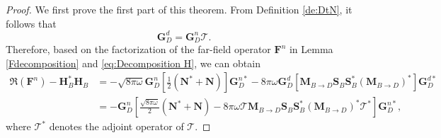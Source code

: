 \documentclass[11pt,reqno,twoside]{amsart}
\theoremstyle{definition}
\theoremstyle{remark}
\numberwithin{equation}{section}
\begin{document}
\begin{proof}
        We first prove the first part of this theorem. From Definition \ref{de:DtN}, it follows that
		\begin{equation}\label{eq:DNrelation}
		    \mathbf G_D^d=\mathbf G_D^n \bm{\mathcal{T}}.
		\end{equation}
	   Therefore, based on the factorization of the far-field operator $\mathbf F^n$ in Lemma \ref{Fdecomposition}  and \eqref{eq:Decomposition H}, we can obtain
		\begin{equation*}\begin{aligned}
		\Re\left( \mathbf F^n\right)-\mathbf H^*_B\mathbf H_B 
		&= -\sqrt{8\pi\omega}\mathbf G_D^n \left[ \frac{1}{2}\left( \mathbf N^*+\mathbf N\right) \right] \mathbf G_D^{n*}- 8\pi\omega\mathbf G_D^d \left[\mathbf M_{B \to D}\mathbf S_B\mathbf S^*_B\left( \mathbf M_{B \to D}\right) ^*\right] \mathbf G_D^{d*}\\
		&=-\mathbf G_D^n \left[ \frac{\sqrt{8\pi\omega}}{2}\left( \mathbf N^*+\mathbf N\right) - 8\pi\omega \bm{\mathcal{T}} \mathbf M_{B \to D}\mathbf S_B\mathbf S^*_B\left( \mathbf M_{B \to D}\right) ^* \bm{\mathcal{T}}^* \right] \mathbf G_D^{n*},
		\end{aligned}\end{equation*}
		where $\bm{\mathcal{T}}^*$ denotes the adjoint operator of $\bm{\mathcal{T}}$.
	

\end{proof}
\end{document}
